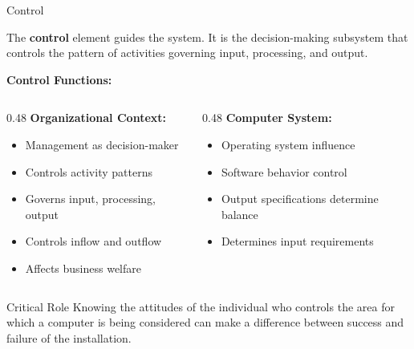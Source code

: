 \documentclass[aspectratio=169]{beamer}
\begin{document}
\begin{frame}{Control}
    \begin{definition}
        The \textbf{control} element guides the system. It is the decision-making subsystem that controls the pattern of activities governing input, processing, and output.
    \end{definition}
     
    \textbf{Control Functions:}
    
    \begin{columns}
        \begin{column}{0.48\textwidth}
            \textbf{Organizational Context:}
            \begin{itemize}
                \item Management as decision-maker
                \item Controls activity patterns
                \item Governs input, processing, output
                \item Controls inflow and outflow
                \item Affects business welfare
            \end{itemize}
        \end{column}
        \begin{column}{0.48\textwidth}
            \textbf{Computer System:}
            \begin{itemize}
                \item Operating system influence
                \item Software behavior control
                \item Output specifications determine balance
                \item Determines input requirements
            \end{itemize}
        \end{column}
    \end{columns}
    
    \vspace{0.2cm}
    \begin{alertblock}{Critical Role}
        Knowing the attitudes of the individual who controls the area for which a computer is being considered can make a difference between success and failure of the installation.
    \end{alertblock}
\end{frame}
\end{document}

